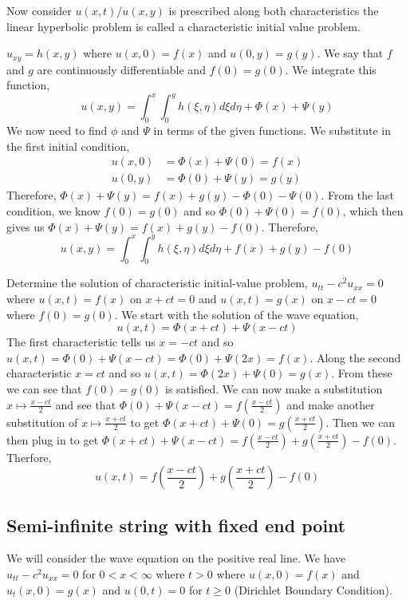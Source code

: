 

\noindent
Now consider $u(x, t)$/$u(x, y)$ is prescribed along both characteristics the linear hyperbolic problem is called a characteristic initial value problem.

\begin{eg}
  $u_{xy} = h(x, y)$ where $u(x, 0) = f(x)$ and $u(0, y) = g(y)$. We say that $f$ and $g$ are continuously differentiable and $f(0) = g(0)$. We integrate this function,
  $$ u(x, y) = \int_0^x\int_0^y h(\xi, \eta) d\xi d\eta + \Phi(x) + \Psi(y) $$
  We now need to find $\phi$ and $\Psi$ in terms of the given functions. We substitute in the first initial condition,
  \begin{align*}
    u(x, 0) &= \Phi(x) + \Psi(0) = f(x) \\
    u(0, y) &= \Phi(0) + \Psi(y) = g(y)
  \end{align*}
  Therefore, $\Phi(x) + \Psi(y) = f(x) + g(y) - \Phi(0) - \Psi(0)$. From the last condition, we know $f(0) = g(0)$ and so $\Phi(0) + \Psi(0) = f(0)$, which then gives us $\Phi(x) + \Psi(y) = f(x) + g(y) - f(0)$. Therefore,
  $$ u(x, y) = \int_0^x\int_0^y h(\xi, \eta) d\xi d\eta + f(x) + g(y) - f(0) $$
\end{eg}

\begin{eg}
  Determine the solution of characteristic initial-value problem, $u_{tt} - c^2u_{xx} = 0$ where $u(x, t) = f(x)$ on $x + ct = 0$ and $u(x, t) = g(x)$ on $x - ct = 0$ where $f(0) = g(0)$. We start with the solution of the wave equation,
  $$ u(x, t) = \Phi(x + ct) + \Psi(x - ct) $$
  The first characteristic tells us $x = -ct$ and so $u(x, t) = \Phi(0) + \Psi(x - ct) = \Phi(0) + \Psi(2x) = f(x)$. Along the second characteristic $x = ct$ and so $u(x, t) = \Phi(2x) + \Psi(0) = g(x)$. From these we can see that $f(0) = g(0)$ is satisfied. We can now make a substitution $x \mapsto \frac{x - ct}{2}$ and see that $\Phi(0) + \Psi(x - ct) = f\left(\frac{x - ct}{2}\right)$ and make another substitution of $x \mapsto \frac{x + ct}{2}$ to get $\Phi(x + ct) + \Psi(0) = g\left( \frac{x + ct}{2} \right)$.
  Then we can then plug in to get $\Phi(x + ct) + \Psi(x - ct) = f\left(\frac{x - ct}{2}\right) + g\left(\frac{x + ct}{2}\right) - f(0)$. Therfore,
  $$ u(x, t) = f\left( \frac{x -ct}{2} \right) + g\left( \frac{x + ct}{2}\right) - f(0) $$
\end{eg}

\subsection{Semi-infinite string with fixed end point}
We will consider the wave equation on the positive real line. We have $u_{tt} - c^2u_{xx} = 0$ for $0 < x < \infty$ where $t > 0$ where $u(x, 0) = f(x)$ and $u_t(x, 0) = g(x)$ and $u(0, t) = 0$ for $t \ge 0$ (Dirichlet Boundary Condition).

